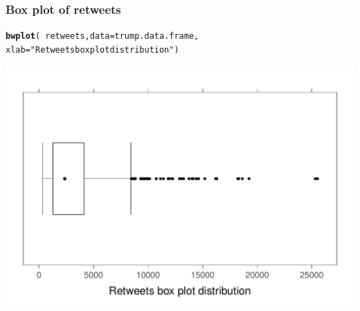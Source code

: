\documentclass{beamer}\usepackage[]{graphicx}\usepackage[]{color}
\makeatletter
\newcommand{\hlstr}[1]{\textcolor[rgb]{0.2,0.2,0.2}{#1}}%
\newcommand{\hlopt}[1]{\textcolor[rgb]{0.102,0.102,0.102}{#1}}%
\newcommand{\hlstd}[1]{\textcolor[rgb]{0.102,0.102,0.102}{#1}}%
\newcommand{\hlkwc}[1]{\textcolor[rgb]{0.2,0.2,0.2}{#1}}%
\newcommand{\hlkwd}[1]{\textcolor[rgb]{0.102,0.102,0.102}{\textbf{#1}}}%
\newenvironment{kframe}{%
 \def\at@end@of@kframe{}%
 \ifinner\ifhmode%
  \def\at@end@of@kframe{\end{minipage}}%
  \begin{minipage}{\columnwidth}%
 \fi\fi%
 \def\FrameCommand##1{\hskip\@totalleftmargin \hskip-\fboxsep
 \colorbox{shadecolor}{##1}\hskip-\fboxsep
     \hskip-\linewidth \hskip-\@totalleftmargin \hskip\columnwidth}%
 \MakeFramed {\advance\hsize-\width
   \@totalleftmargin\z@ \linewidth\hsize
   \@setminipage}}%
 {\par\unskip\endMakeFramed%
 \at@end@of@kframe}
\newenvironment{knitrout}{}{} %
\renewenvironment{knitrout}{\begin{spacing}{0.75}\begin{tiny}}{\end{tiny}\end{spacing}}
\makeatother
\begin{document}
\begin{frame}[fragile]
\frametitle{Box plot of retweets}

\begin{knitrout}\small
{}\color{fgcolor}\begin{kframe}
\begin{alltt}
\hlkwd{bwplot}\hlstd{(}\hlopt{~} \hlstd{retweets,} \hlkwc{data}\hlstd{=trump.data.frame,}
       \hlkwc{xlab}\hlstd{=}\hlstr{"Retweets box plot distribution"}\hlstd{)}
\end{alltt}
\end{kframe}

{\centering \includegraphics[width=0.99\linewidth]{figure/graphics-bw_retweets-1} 

}



\end{knitrout}

\end{frame}
\end{document}
